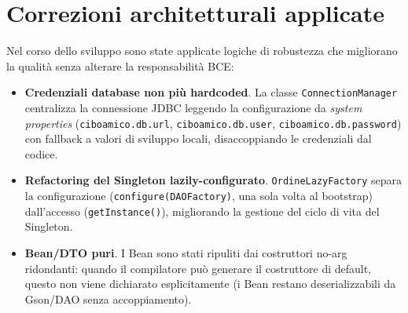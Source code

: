 \section{Correzioni architetturali applicate}
\label{sec:qualita_correzioni}

Nel corso dello sviluppo sono state applicate logiche di robustezza che
migliorano la qualità senza alterare la responsabilità BCE:

\begin{itemize}
    \item \textbf{Credenziali database non più hardcoded}. La classe
    \texttt{ConnectionManager} centralizza la connessione JDBC leggendo la
    configurazione da \emph{system properties}
    (\texttt{ciboamico.db.url}, \texttt{ciboamico.db.user},
    \texttt{ciboamico.db.password}) con fallback a valori di sviluppo locali,
    disaccoppiando le credenziali dal codice.
    \item \textbf{Refactoring del Singleton lazily-configurato}.
    \texttt{OrdineLazyFactory} separa la configurazione (\texttt{configure(DAOFactory)},
    una sola volta al bootstrap) dall'accesso (\texttt{getInstance()}),
    migliorando la gestione del ciclo di vita del Singleton.
    \item \textbf{Bean/DTO puri}. I Bean sono stati ripuliti dai costruttori
    no-arg ridondanti: quando il compilatore può generare il costruttore di
    default, questo non viene dichiarato esplicitamente (i Bean restano
    deserializzabili da Gson/DAO senza accoppiamento).
\end{itemize}
